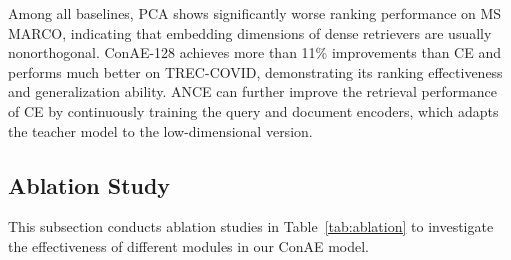 \documentclass[11pt]{article}
\begin{document}
Among all baselines, PCA shows significantly worse ranking performance on MS MARCO, indicating that embedding dimensions of dense retrievers are usually nonorthogonal. ConAE-128 achieves more than 11\% improvements than CE and performs much better on TREC-COVID, demonstrating its ranking effectiveness and generalization ability. ANCE can further improve the retrieval performance of CE by continuously training the query and document encoders, which adapts the teacher model to the low-dimensional version.



\subsection{Ablation Study}\label{sec:ablation}
This subsection conducts ablation studies in Table~\ref{tab:ablation} to investigate the effectiveness of different modules in our ConAE model.

\begin{table}
\centering
\small
{}
\caption{Retrieval Performance of Different Ablation Models. ConAE w/o Decoder and ConAE w/o KL use $L_{KL}$ and $L_q + L_d$ to train the distillation models.}
\label{tab:ablation}
\end{table}
\end{document}
